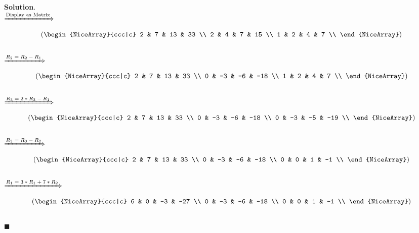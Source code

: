 \documentclass[12pt]{article}
\renewcommand{\=}[1]{\stackrel{#1}{=}} %
\theoremstyle{definition}
\newenvironment{s}{%
        \begin{trivlist} \item \textbf{Solution}. }{%
            \hspace*{\fill} $\blacksquare$\end{trivlist}}%
\begin{document}
\begin{s} \newline \\
  $\xRightarrow{\text{Display as Matrix}}$
  \\
     
  \[
    \left(\begin{NiceArray}{ccc|c}
      2 & 7 & 13 & 33 \\
      2 & 4 & 7  & 15 \\
      1 & 2 & 4  & 7 \\
    \end{NiceArray} \right)
  \]
  \\
  $\xRightarrow{\text{$R_2 = R_2 - R_1$}}$
  \\
     
  \[
    \left(\begin{NiceArray}{ccc|c}
      2 & 7  & 13 & 33  \\
      0 & -3 & -6 & -18 \\
      1 & 2  & 4  & 7   \\
    \end{NiceArray} \right)
  \]
  \\
  $\xRightarrow{\text{$R_3 = 2 * R_3 - R_1$}}$
  \\
     
  \[
    \left(\begin{NiceArray}{ccc|c}
      2 & 7  & 13 & 33  \\
      0 & -3 & -6 & -18 \\
      0 & -3 & -5 & -19 \\
    \end{NiceArray} \right)
  \]
  \\
  $\xRightarrow{\text{$R_3 = R_3 - R_2$}}$
  \\
     
  \[
    \left(\begin{NiceArray}{ccc|c}
      2 & 7  & 13 & 33  \\
      0 & -3 & -6 & -18 \\
      0 & 0  & 1  & -1  \\
    \end{NiceArray} \right)
  \]
  \\

  $\xRightarrow{\text{$R_1 = 3 * R_1 + 7 * R_2$}}$
  \\
     
  \[
    \left(\begin{NiceArray}{ccc|c}
      6 & 0  & -3 & -27  \\
      0 & -3 & -6 & -18 \\
      0 & 0  & 1  & -1  \\
    \end{NiceArray} \right)
  \]
  \\


\end{s}
\end{document}
